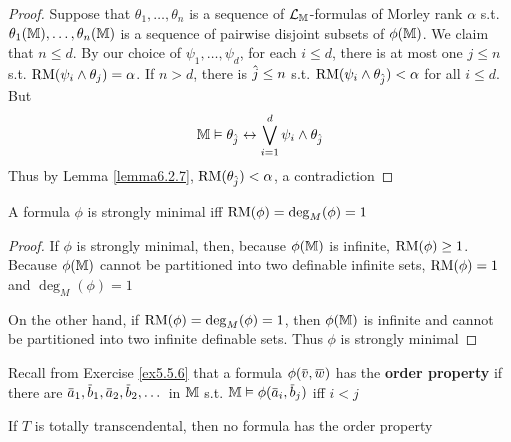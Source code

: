 \documentclass[11pt]{article}
\begin{document}
\begin{proof}
Suppose that \(\theta_1,\dots,\theta_n\) is a sequence of \(\mathcal{L}_{\mathbb{M}}\)-formulas of Morley rank \(\alpha\)
s.t. \(\theta_1(\mathbb{M}),\dots,\theta_n(\mathbb{M})\) is a sequence of pairwise disjoint subsets of \(\phi(\mathbb{M})\). We claim
that \(n\le d\). By our choice of \(\psi_1,\dots,\psi_d\), for each \(i\le d\), there is at most one \(j\le n\)
s.t. \(\operatorname{RM}(\psi_i\wedge\theta_j)=\alpha\).  If \(n>d\), there is \(\hat{j}\le n\) s.t. \(\operatorname{RM}(\psi_i\wedge\theta_{\hat{j}})<\alpha\) for
all \(i\le d\). But
\begin{equation*}
\mathbb{M}\vDash\theta_{\hat{j}}\leftrightarrow\bigvee_{i=1}^d\psi_i\wedge\theta_{\hat{j}}
\end{equation*}
Thus by Lemma \ref{lemma6.2.7}, \(\operatorname{RM}(\theta_{\hat{j}})<\alpha\), a contradiction
\end{proof}

\begin{corollary}[]
A formula \(\phi\) is strongly minimal iff \(\operatorname{RM}(\phi)=\deg_M(\phi)=1\)
\end{corollary}

\begin{proof}
If \(\phi\) is strongly minimal, then, because \(\phi(\mathbb{M})\) is infinite, \(\operatorname{RM}(\phi)\ge 1\). Because \(\phi(\mathbb{M})\)
cannot be partitioned into two definable infinite sets, \(\operatorname{RM}(\phi)=1\) and \(\deg_M(\phi)=1\)

On the other hand, if \(\operatorname{RM}(\phi)=\deg_M(\phi)=1\), then \(\phi(\mathbb{M})\) is infinite and cannot be
partitioned into two infinite definable sets. Thus \(\phi\) is strongly minimal
\end{proof}

Recall from Exercise \ref{ex5.5.6} that a formula \(\phi(\barv,\barw)\) has the \textbf{order property} if
there are \(\bara_1,\barb_1,\bara_2,\barb_2,\dots\) in \(\mathbb{M}\) s.t. \(\M\vDash\phi(\bara_i,\barb_j)\) iff \(i<j\)

\begin{proposition}[]
If \(T\) is totally transcendental, then no formula has the order property
\end{proposition}
\end{document}
